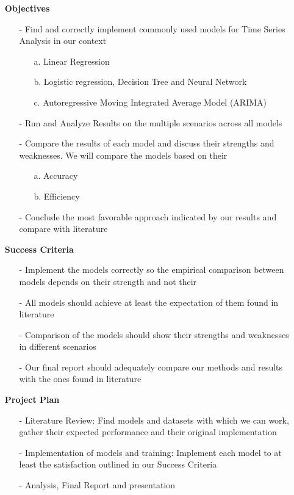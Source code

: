 \documentclass[12pt, letterpaper]{article}
\begin{document}
\begin{enumerate}
    \item [] \textbf{Objectives }
        \begin{itemize}
            \item[-] Find and correctly implement commonly used models for Time Series Analysis in our context
              \begin{itemize}
              \item [a.]Linear Regression
              \item [b.]Logistic regression, Decision Tree and Neural Network
              \item [c.]Autoregressive Moving Integrated Average Model (ARIMA)
              \end{itemize}
            \item[-] Run and Analyze Results on the multiple scenarios across all models
            \item[-] Compare the results of each model and discuss their strengths and weaknesses. We will compare the models based on their
              \begin{itemize}
                \item [a.] Accuracy
                \item [b.] Efficiency
              \end{itemize}
            \item[-] Conclude the most favorable approach indicated by our results and compare with literature
        \end{itemize} 
    \item [] \textbf{Success Criteria}
        \begin{itemize}
            \item [-] Implement the models correctly so the empirical comparison between models depends on their strength and not their
            \item [-] All models should achieve at least the expectation of them found in literature
            \item [-] Comparison of the models should show their strengths and weaknesses in different scenarios
            \item [-] Our final report should adequately compare our methods and results with the ones found in literature
        \end{itemize}
        
    \item [] \textbf{Project Plan} %
        \begin{itemize}
            \item [-] Literature Review: Find models and datasets with which we can work, gather their expected performance and their original implementation
            \item [-] Implementation of models and training: Implement each model to at least the satisfaction outlined in our Success Criteria
            \item [-] Analysis, Final Report and presentation
        \end{itemize}
    

\end{enumerate}
\end{document}
